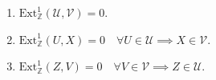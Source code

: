 \documentclass[preview]{standalone}
\begin{document}
\begin{center}
\begin{enumerate} \item $\text{Ext}^1_\mathbb{Z} (\mathcal{U}, \mathcal{V}) = 0$. \item $\text{Ext}^1_\mathbb{Z} (U, X) = 0 \quad \forall U\in\mathcal{U} \implies X\in\mathcal{V}$. \item $\text{Ext}^1_\mathbb{Z} (Z, V) = 0 \quad \forall V\in\mathcal{V} \implies Z\in\mathcal{U}$. \end{enumerate}
\end{center}
\end{document}
